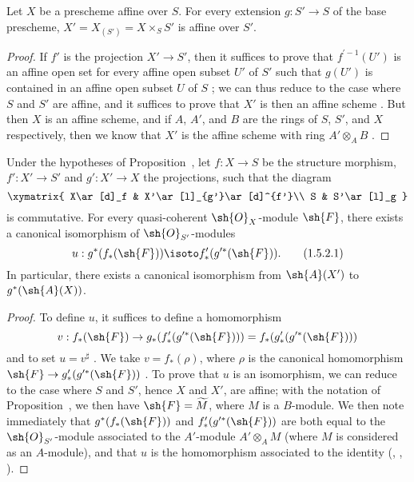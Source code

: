 \begin{proposition}[1.5.1]
\label{2.1.5.1}
Let $X$ be a prescheme affine over $S$.
For every extension $g:S'\to S$ of the base prescheme, $X'=X_{(S')}=X\times_S S'$ is affine over $S'$.
\end{proposition}

\begin{proof}
\label{proof-2.1.5.1}
If $f'$ is the projection $X'\to S'$, then it suffices to prove that $f^{\prime-1}(U')$ is an affine open set for every affine open subset $U'$ of $S'$ such that $g(U')$ is contained in an affine open subset $U$ of $S$ ; we can thus reduce to the case where $S$ and $S'$ are affine, and it suffices to prove that $X'$ is then an affine scheme .
But then  $X$ is an affine scheme, and if $A$, $A'$, and $B$ are the rings of $S$, $S'$, and $X$ respectively, then we know that $X'$ is the affine scheme with ring $A'\otimes_A B$ .
\end{proof}

\begin{corollary}[1.5.2]
\label{2.1.5.2}
Under the hypotheses of Proposition~, let $f:X\to S$ be the structure morphism, $f':X'\to S'$ and $g':X'\to X$ the projections, such that the diagram
\[
  \xymatrix{
    X\ar[d]_f &
    X'\ar[l]_{g'}\ar[d]^{f'}\\
    S &
    S'\ar[l]_g
  }
\]
is commutative.
For every quasi-coherent $\sh{O}_X$-module $\sh{F}$, there exists a canonical isomorphism of $\sh{O}_{S'}$-modules
\[
\label{eq:2.1.5.2.1}
  u:g^*(f_*(\sh{F}))\isoto f_*'(g^{\prime*}(\sh{F})).
  \tag{1.5.2.1}
\]
In particular, there exists a canonical isomorphism from $\sh{A}(X')$ to $g^*(\sh{A}(X))$.
\end{corollary}

\begin{proof}
\label{proof-2.1.5.2}
To define $u$, it suffices to define a homomorphism
\[
  v:f_*(\sh{F})\to g_*(f_*'(g^{\prime*}(\sh{F})))=f_*(g_*'(g^{\prime*}(\sh{F})))
\]
and to set $u=v^\sharp$ .
We take $v=f_*(\rho)$, where $\rho$ is the canonical homomorphism $\sh{F}\to g_*'(g^{\prime*}(\sh{F}))$ .
To prove that $u$ is an isomorphism, we can reduce to the case where $S$ and $S'$, hence $X$ and $X'$, are affine; with the notation of Proposition~, we then have $\sh{F}=\widetilde{M}$, where $M$ is a $B$-module.
We then note immediately that $g^*(f_*(\sh{F}))$ and $f_*'(g^{\prime*}(\sh{F}))$ are both equal to the $\sh{O}_{S'}$-module associated to the $A'$-module $A'\otimes_A M$ (where $M$ is considered as an $A$-module), and that $u$ is the homomorphism associated to the identity (, , ).
\end{proof}

